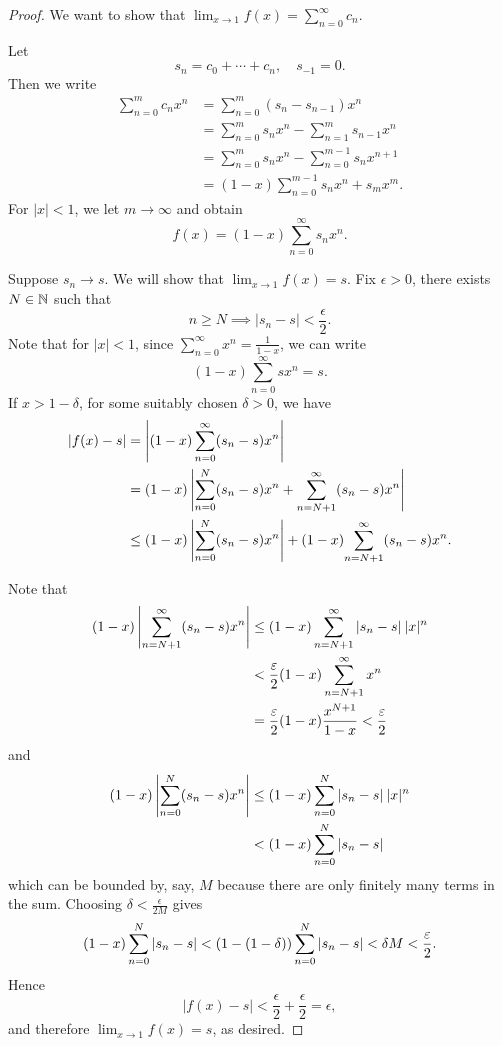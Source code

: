 \begin{proof}
We want to show that $\displaystyle\lim_{x\to 1}f(x)=\sum_{n=0}^{\infty}c_n$.

Let
\[s_n=c_0+\cdots+c_n,\quad s_{-1}=0.\]
Then we write
\begin{align*}
\sum_{n=0}^{m}c_nx^n
&=\sum_{n=0}^{m}(s_n-s_{n-1})x^n\\
&=\sum_{n=0}^{m}s_nx^n-\sum_{n=1}^{m}s_{n-1}x^n\\
&=\sum_{n=0}^{m}s_nx^n-\sum_{n=0}^{m-1}s_nx^{n+1}\\
&=(1-x)\sum_{n=0}^{m-1}s_nx^n+s_mx^m.
\end{align*}
For $|x|<1$, we let $m\to\infty$ and obtain
\[f(x)=(1-x)\sum_{n=0}^{\infty}s_nx^n.\]

Suppose $s_n\to s$. We will show that $\displaystyle\lim_{x\to1}f(x)=s$. Fix $\epsilon>0$, there exists $N\in\mathbb N$ such that
\[n\ge N\implies|s_n-s|<\frac{\epsilon}{2}.\]
Note that for $|x|<1$, since $\displaystyle\sum_{n=0}^{\infty}x^n=\frac{1}{1-x}$, we can write
\[(1-x)\sum_{n=0}^{\infty}sx^n=s.\]
If $x>1-\delta$, for some suitably chosen $\delta>0$, we have
\begin{align*}
|f(x)-s|
&=\left|(1-x)\sum_{n=0}^\infty(s_n-s)x^n\right|\\
&=(1-x)\left|\sum_{n=0}^{N}(s_n-s)x^n+\sum_{n=N+1}^{\infty}(s_n-s)x^n\right|\\
&\le(1-x)\left|\sum_{n=0}^{N}(s_n-s)x^n\right|+(1-x){\sum_{n=N+1}^{\infty}(s_n-s)x^n}.
\end{align*}

Note that
\begin{align*}
(1-x)\left|\sum_{n=N+1}^{\infty}(s_n-s)x^n\right|
&\le(1-x)\sum_{n=N+1}^{\infty}|s_n-s|\:|x|^n\\
&<\frac{\varepsilon}{2}(1-x)\sum_{n=N+1}^{\infty}x^n\\
&=\frac{\varepsilon}{2}(1-x)\frac{x^{N+1}}{1-x}<\frac{\varepsilon}{2}
\end{align*}
and
\begin{align*}
(1-x)\left|\sum_{n=0}^{N}(s_n-s)x^n\right|
&\le(1-x)\sum_{n=0}^{N}|s_n-s|\:|x|^n\\
&<(1-x)\sum_{n=0}^{N}|s_n-s|
\end{align*}
which can be bounded by, say, $M$ because there are only finitely many terms in the sum. Choosing $\delta<\frac{\epsilon}{2M}$ gives
\[(1-x)\sum_{n=0}^{N}|s_n-s|<\left(1-(1-\delta)\right)\sum_{n=0}^{N}|s_n-s|<\delta M<\frac{\varepsilon}{2}.\]
Hence
\[|f(x)-s|<\frac{\epsilon}{2}+\frac{\epsilon}{2}=\epsilon,\]
and therefore $\displaystyle\lim_{x\to1}f(x)=s$, as desired.
\end{proof}

